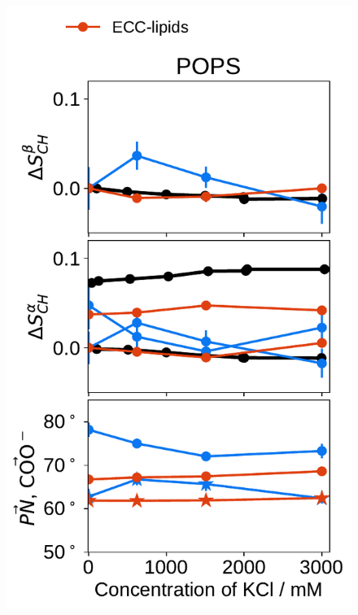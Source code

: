 \documentclass[journal=jpcbfk,manuscript=article]{achemso}
\newlength{\figheightsmall}
\newlength{\figheight}
\begin{document}
\begin{figure}[tbp!]
  \includegraphics[height=\figheightsmall]{../img/ecc_pops/order_parameters_changes_ecc-lip_L14_A-B-PN-COO_POPS_kcl.pdf} 

\end{figure}
\end{document}
